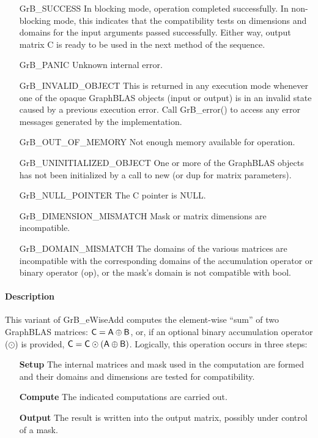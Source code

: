 \begin{itemize}[leftmargin=2.1in]
    \item[{\sf GrB\_SUCCESS}]         In blocking mode, operation
	completed successfully. In non-blocking mode, this indicates
	that the compatibility tests on dimensions and domains for the
	input arguments passed successfully. Either way, output matrix
	{\sf C} is ready to be used in the next method of the sequence.

    \item[{\sf GrB\_PANIC}]           Unknown internal error.
    
    \item[{\sf GrB\_INVALID\_OBJECT}] This is returned in any execution mode 
    whenever one of the opaque GraphBLAS objects (input or output) is in an invalid 
    state caused by a previous execution error.  Call {GrB\_error()} to access 
    any error messages generated by the implementation.

    \item[{\sf GrB\_OUT\_OF\_MEMORY}]        Not enough memory available for operation.
    
    \item[{\sf GrB\_UNINITIALIZED\_OBJECT}] One or more of the GraphBLAS objects 
    has not been initialized by a call to {\sf new} (or {\sf dup} for matrix
    parameters).
    
    \item[{\sf GrB\_NULL\_POINTER}]  The {\sf C} pointer is {\sf NULL}.

    \item[{\sf GrB\_DIMENSION\_MISMATCH}] Mask or matrix dimensions are incompatible.

	\item[{\sf GrB\_DOMAIN\_MISMATCH}]    The domains of the various
	matrices are incompatible with the corresponding domains of the
	accumulation operator or binary operator ({\sf op}), or the mask's domain 
    is not compatible with bool.
\end{itemize}

\paragraph{Description}

This variant of {\sf GrB\_eWiseAdd } computes the element-wise ``sum'' of
two GraphBLAS matrices: ${\sf C} = {\sf A} \oplus {\sf B}$, or, if an optional
binary accumulation operator ($\odot$) is provided, ${\sf C} = {\sf C} \odot
\left({\sf A} \oplus {\sf B}\right)$.  Logically, this operation occurs in
three steps:
\begin{enumerate}[leftmargin=0.75in]
\item[\bf Setup] The internal matrices and mask used in the computation are formed 
and their domains and dimensions are tested for compatibility.
\item[\bf Compute] The indicated computations are carried out.
\item[\bf Output] The result is written into the output matrix, possibly under 
control of a mask.
\end{enumerate}

